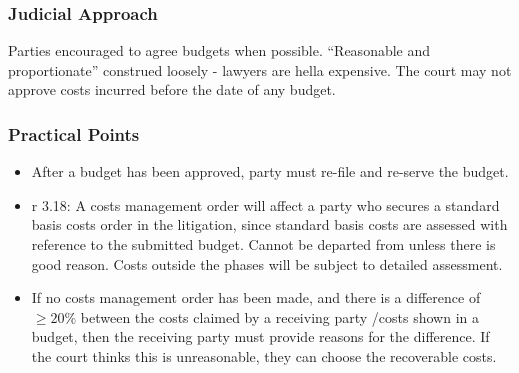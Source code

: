 \documentclass[
]{article}
\providecommand{\tightlist}{%
  \setlength{\itemsep}{0pt}\setlength{\parskip}{0pt}}
\begin{document}
\hypertarget{judicial-approach}{%
\subsubsection{Judicial Approach}\label{judicial-approach}}

Parties encouraged to agree budgets when possible. ``Reasonable and
proportionate'' construed loosely - lawyers are hella expensive. The
court may not approve costs incurred before the date of any budget.

\hypertarget{practical-points}{%
\subsubsection{Practical Points}\label{practical-points}}

\begin{itemize}
\tightlist
\item
  After a budget has been approved, party must re-file and re-serve the
  budget.
\item
  r 3.18: A costs management order will affect a party who secures a
  standard basis costs order in the litigation, since standard basis
  costs are assessed with reference to the submitted budget. Cannot be
  departed from unless there is good reason. Costs outside the phases
  will be subject to detailed assessment.
\item
  If no costs management order has been made, and there is a difference
  of \(\geq 20\%\) between the costs claimed by a receiving party /costs
  shown in a budget, then the receiving party must provide reasons for
  the difference. If the court thinks this is unreasonable, they can
  choose the recoverable costs.
\end{itemize}
\end{document}
